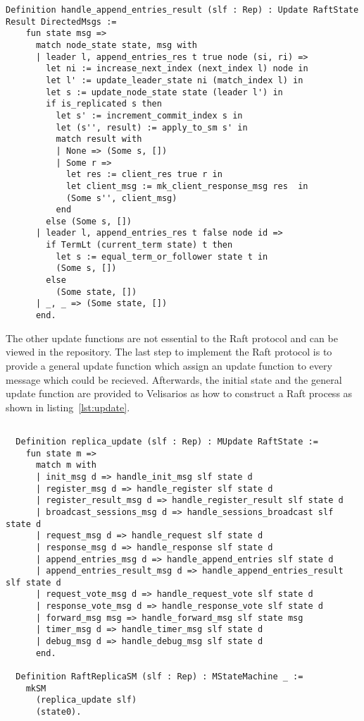 \begin{lstlisting}[style=coq,label=lst:rreplicate,
caption=The definitions on how a node changes it node state.]
  Definition handle_append_entries_result (slf : Rep) : Update RaftState Result DirectedMsgs :=
    fun state msg =>
      match node_state state, msg with
      | leader l, append_entries_res t true node (si, ri) =>
        let ni := increase_next_index (next_index l) node in
        let l' := update_leader_state ni (match_index l) in
        let s := update_node_state state (leader l') in
        if is_replicated s then
          let s' := increment_commit_index s in
          let (s'', result) := apply_to_sm s' in
          match result with
          | None => (Some s, [])
          | Some r =>
            let res := client_res true r in
            let client_msg := mk_client_response_msg res  in
            (Some s'', client_msg)
          end
        else (Some s, [])
      | leader l, append_entries_res t false node id =>
        if TermLt (current_term state) t then
          let s := equal_term_or_follower state t in
          (Some s, [])
        else
          (Some state, [])
      | _, _ => (Some state, [])
      end.
\end{lstlisting}

The other update functions are not essential to the Raft protocol
and can be viewed in the repository. The last step to implement the
Raft protocol is to provide a general update function
which assign an update function to every message which could
be recieved. Afterwards, the initial state and the general
update function are provided to Velisarios as how to construct
a Raft process as shown in listing~\ref{lst:update}.

\begin{lstlisting}[style=coq,label=lst:update,
caption=The definitions on how a node changes it node state.]

  Definition replica_update (slf : Rep) : MUpdate RaftState :=
    fun state m =>
      match m with
      | init_msg d => handle_init_msg slf state d
      | register_msg d => handle_register slf state d
      | register_result_msg d => handle_register_result slf state d
      | broadcast_sessions_msg d => handle_sessions_broadcast slf state d
      | request_msg d => handle_request slf state d
      | response_msg d => handle_response slf state d
      | append_entries_msg d => handle_append_entries slf state d
      | append_entries_result_msg d => handle_append_entries_result slf state d
      | request_vote_msg d => handle_request_vote slf state d
      | response_vote_msg d => handle_response_vote slf state d
      | forward_msg msg => handle_forward_msg slf state msg
      | timer_msg d => handle_timer_msg slf state d
      | debug_msg d => handle_debug_msg slf state d
      end.

  Definition RaftReplicaSM (slf : Rep) : MStateMachine _ :=
    mkSM
      (replica_update slf)
      (state0).
\end{lstlisting}

